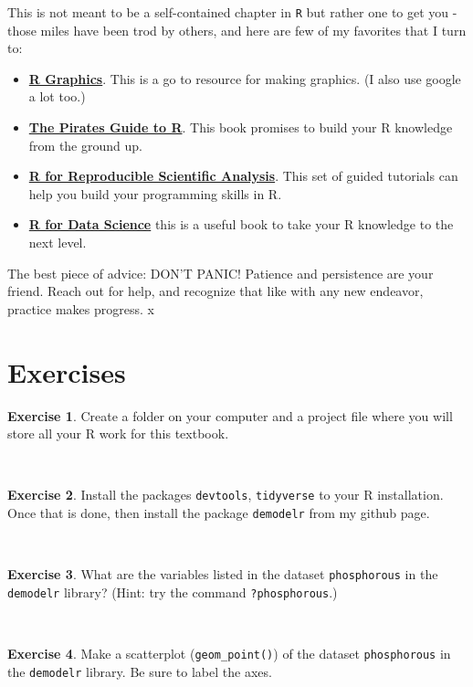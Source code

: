 \documentclass[
]{book}
\providecommand{\tightlist}{%
  \setlength{\itemsep}{0pt}\setlength{\parskip}{0pt}}
\theoremstyle{definition}
\theoremstyle{definition}
\theoremstyle{definition}
\newtheorem{exercise}{Exercise}[chapter]
\theoremstyle{remark}
\begin{document}
This is not meant to be a self-contained chapter in \texttt{R} but rather one to get you - those miles have been trod by others, and here are few of my favorites that I turn to:

\begin{itemize}
\tightlist
\item
  \href{http://www.cookbook-r.com/}{\textbf{R Graphics}}. This is a go to resource for making graphics. (I also use google a lot too.)
\item
  \href{https://bookdown.org/ndphillips/YaRrr/}{\textbf{The Pirates Guide to R}}. This book promises to build your R knowledge from the ground up.
\item
  \href{http://swcarpentry.github.io/r-novice-gapminder/}{\textbf{R for Reproducible Scientific Analysis}}. This set of guided tutorials can help you build your programming skills in R.
\item
  \href{https://r4ds.had.co.nz/}{\textbf{R for Data Science}} this is a useful book to take your R knowledge to the next level.
\end{itemize}

The best piece of advice: DON'T PANIC! Patience and persistence are your friend. Reach out for help, and recognize that like with any new endeavor, practice makes progress.
x
\newpage

\hypertarget{exercises-1}{%
\section{Exercises}\label{exercises-1}}

\begin{exercise}
\protect\hypertarget{exr:unnamed-chunk-38}{}{\label{exr:unnamed-chunk-38} }Create a folder on your computer and a project file where you will store all your R work for this textbook.
\end{exercise}
~
\begin{exercise}
\protect\hypertarget{exr:unnamed-chunk-39}{}{\label{exr:unnamed-chunk-39} }Install the packages \texttt{devtools}, \texttt{tidyverse} to your R installation. Once that is done, then install the package \texttt{demodelr} from my github page.
\end{exercise}
~
\begin{exercise}
\protect\hypertarget{exr:unnamed-chunk-40}{}{\label{exr:unnamed-chunk-40} }What are the variables listed in the dataset \texttt{phosphorous} in the \texttt{demodelr} library? (Hint: try the command \texttt{?phosphorous}.)
\end{exercise}
~
\begin{exercise}
\protect\hypertarget{exr:unnamed-chunk-41}{}{\label{exr:unnamed-chunk-41} }Make a scatterplot (\texttt{geom\_point()}) of the dataset \texttt{phosphorous} in the \texttt{demodelr} library. Be sure to label the axes.
\end{exercise}
~
\end{document}
